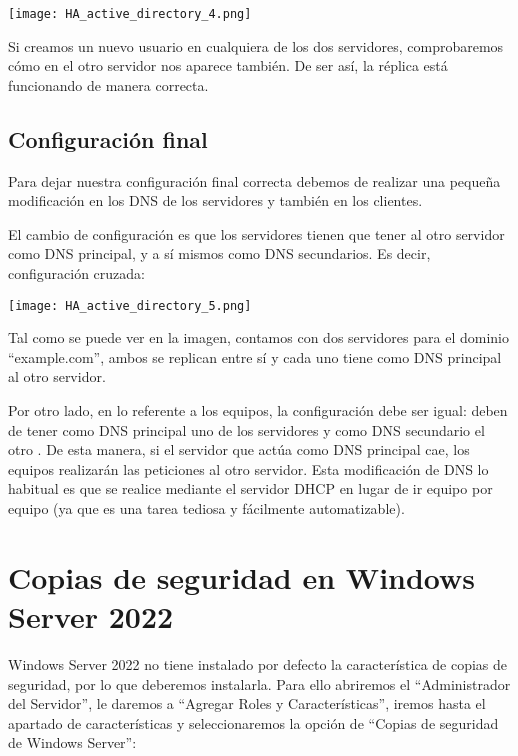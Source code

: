 \begin{center}
    \vspace{-10pt}
    \texttt{[image: HA\_active\_directory\_4.png]}
\end{center}

Si creamos un nuevo usuario en cualquiera de los dos servidores, comprobaremos cómo en el otro servidor nos aparece también. De ser así, la réplica está funcionando de manera correcta.

\section{Configuración final}
Para dejar nuestra configuración final correcta debemos de realizar una pequeña modificación en los DNS de los servidores y también en los clientes.

El cambio de configuración es que los servidores tienen que tener al otro servidor como DNS principal, y a sí mismos como DNS secundarios. Es decir, configuración cruzada:

\begin{center}
    \vspace{-10pt}
    \texttt{[image: HA\_active\_directory\_5.png]}
    \vspace{-20pt}
\end{center}

Tal como se puede ver en la imagen, contamos con dos servidores para el dominio “example.com”, ambos se replican entre sí y cada uno tiene como DNS principal al otro servidor.

Por otro lado, en lo referente a los equipos, la configuración debe ser igual: deben de tener como DNS principal uno de los servidores y como DNS secundario el otro . De esta manera, si el servidor que actúa como DNS principal cae, los equipos realizarán las peticiones al otro servidor. Esta modificación de DNS lo habitual es que se realice mediante el servidor DHCP en lugar de ir equipo por equipo (ya que es una tarea tediosa y fácilmente automatizable).

\chapter{Copias de seguridad en Windows Server 2022}
Windows Server 2022 no tiene instalado por defecto la característica de copias de seguridad, por lo que deberemos instalarla. Para ello abriremos el “Administrador del Servidor”, le daremos a “Agregar Roles y Características”, iremos hasta el apartado de características y seleccionaremos la opción de “Copias de seguridad de Windows Server”:

